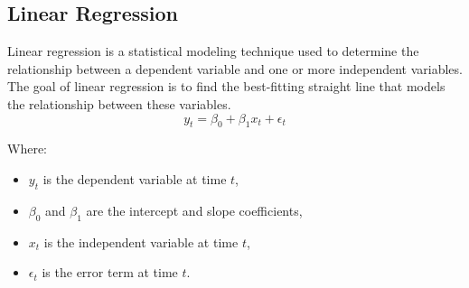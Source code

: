 \documentclass{ieeeojies}
\begin{document}
\subsection{Linear Regression}
Linear regression is a statistical modeling technique used to determine the relationship between a dependent variable and one or more independent variables. The goal of linear regression is to find the best-fitting straight line that models the relationship between these variables.
\begin{equation}
y_t = \beta_0 + \beta_1 x_t + \epsilon_t
\end{equation}

Where:
\begin{itemize}
    \item \( y_t \) is the dependent variable at time \( t \),
    \item \( \beta_0 \) and \( \beta_1 \) are the intercept and slope coefficients,
    \item \( x_t \) is the independent variable at time \( t \),
    \item \( \epsilon_t \) is the error term at time \( t \).
\end{itemize}
\end{document}
